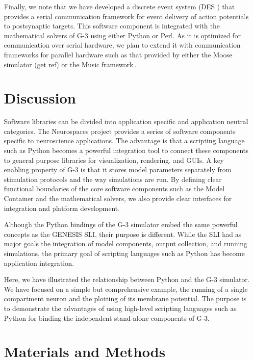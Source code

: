 \documentclass[10pt]{article}
\begin{document}
Finally, we note that we have developed a discrete event system (DES ) that provides a serial communication
framework for event delivery of action potentials to postsynaptic
targets.  This software component is
integrated with the mathematical solvers of G-3 using either Python or Perl.
As it is optimized for communication over serial hardware, we
plan to extend it with communication frameworks for parallel hardware
such as that provided by either the Moose simulator (get ref) or the Music
framework\,\cite{ekeberg08:_music_multis_coord}.

\section*{Discussion}

Software libraries can be divided into application specific and
application neutral categories.  The Neurospaces project provides a
series of software components specific to neuroscience applications.
The advantage is that a scripting language such as Python becomes a
powerful integration tool to connect these components to general
purpose libraries for visualization, rendering, and GUIs.  A key enabling property of G-3 is that it stores model parameters
separately from stimulation protocols and the way simulations are run.
By defining clear functional boundaries of the core software
components such as the Model Container and the mathematical solvers,
we also provide clear interfaces for integration and platform development.  

Although the Python bindings of the G-3 simulator embed the same
powerful concepts as the GENESIS SLI, their purpose is different.
While the SLI had as major goals the integration of model components,
output collection, and running simulations, the primary goal of
scripting languages such as Python has become application integration.

Here, we have illustrated the relationship between Python and the G-3
simulator.  We have focused on a simple but comprehensive example, the
running of a single compartment neuron and the plotting of its
membrane potential. The purpose is to demonstrate the advantages of
using high-level scripting languages such as Python for binding the
independent stand-alone components of G-3.

\section*{Materials and Methods}
\end{document}
